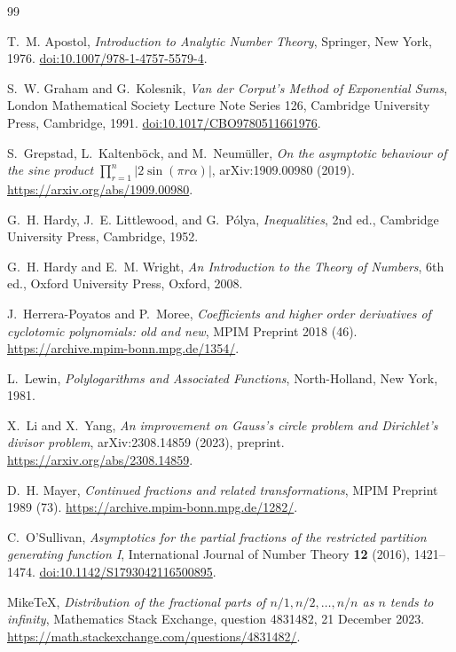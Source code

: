 \documentclass[11pt]{amsart}
\numberwithin{equation}{section}
\theoremstyle{definition}
\theoremstyle{remark}
\begin{document}
\begin{thebibliography}{99}
\raggedright

T.~M. Apostol,
\emph{Introduction to Analytic Number Theory},
Springer, New York, 1976.
\href{https://doi.org/10.1007/978-1-4757-5579-4}
{doi:10.1007/978-1-4757-5579-4}.

S.~W. Graham and G.~Kolesnik,
\emph{Van der Corput's Method of Exponential Sums},
London Mathematical Society Lecture Note Series 126,
Cambridge University Press, Cambridge, 1991.
\href{https://doi.org/10.1017/CBO9780511661976}
{doi:10.1017/CBO9780511661976}.

S.~Grepstad, L.~Kaltenb\"ock, and M.~Neum\"uller,
\emph{On the asymptotic behaviour of the sine product
\(\prod_{r=1}^n|2\sin(\pi r\alpha)|\)},
arXiv:1909.00980 (2019).
\url{https://arxiv.org/abs/1909.00980}.

G.~H. Hardy, J.~E. Littlewood, and G.~P\'olya,
\emph{Inequalities}, 2nd ed., Cambridge University Press, Cambridge, 1952.

G.~H. Hardy and E.~M. Wright,
\emph{An Introduction to the Theory of Numbers}, 6th ed.,
Oxford University Press, Oxford, 2008.

J.~Herrera-Poyatos and P.~Moree,
\emph{Coefficients and higher order derivatives of cyclotomic polynomials:
old and new}, MPIM Preprint 2018 (46).
\url{https://archive.mpim-bonn.mpg.de/1354/}.

L.~Lewin,
\emph{Polylogarithms and Associated Functions},
North-Holland, New York, 1981.

X.~Li and X.~Yang,
\emph{An improvement on Gauss's circle problem and Dirichlet's divisor problem},
arXiv:2308.14859 (2023), preprint.
\url{https://arxiv.org/abs/2308.14859}.

D.~H. Mayer,
\emph{Continued fractions and related transformations},
MPIM Preprint 1989 (73).
\url{https://archive.mpim-bonn.mpg.de/1282/}.

C.~O'Sullivan,
\emph{Asymptotics for the partial fractions of the restricted partition
generating function I},
International Journal of Number Theory \textbf{12} (2016), 1421--1474.
\href{https://doi.org/10.1142/S1793042116500895}
{doi:10.1142/S1793042116500895}.

MikeTeX,
\emph{Distribution of the fractional parts of \(n/1,n/2,\ldots,n/n\) as
\(n\) tends to infinity},
Mathematics Stack Exchange, question 4831482, 21 December 2023.
\url{https://math.stackexchange.com/questions/4831482/}.


\end{thebibliography}
\end{document}
